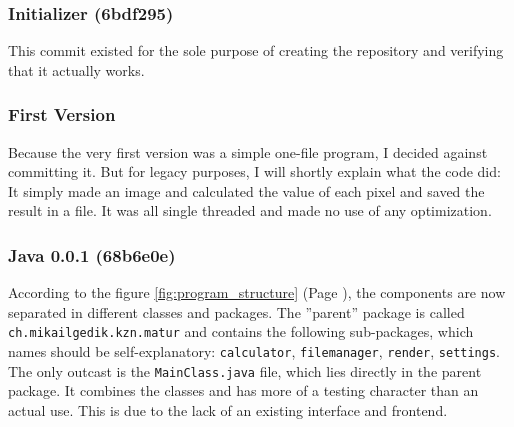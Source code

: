 \documentclass[10pt,a4paper,titlepage]{article}
\begin{document}
	\subsubsection{Initializer (6bdf295)}
	This commit existed for the sole purpose of creating the repository and verifying that it actually works.
	\subsubsection{First Version}
	Because the very first version was a simple one-file program, I decided against committing it. But for legacy purposes, I will shortly explain what the code did: It simply made an image and calculated the value of each pixel and saved the result in a file. It was all single threaded and made no use of any optimization.
	\subsubsection{Java 0.0.1 (68b6e0e)}
	According to the figure \ref{fig:program_structure} (Page \pageref{fig:program_structure}), the components are now separated in different classes and packages. The ''parent'' package is called \verb|ch.mikailgedik.kzn.matur| and contains the following sub-packages, which names should be self-explanatory: \verb|calculator|, \verb|filemanager|, \verb|render|, \verb|settings|. The only outcast is the \verb|MainClass.java| file, which lies directly in the parent package. It combines the classes and has more of a testing character than an actual use. This is due to the lack of an existing interface and frontend.\\
\end{document}
